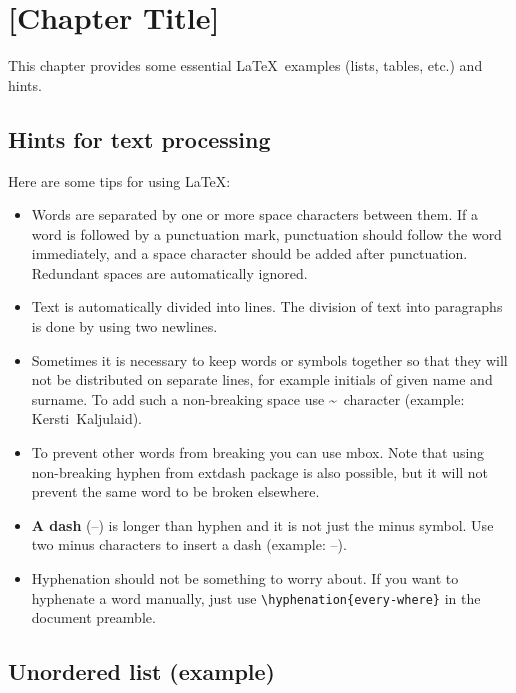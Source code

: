 \section{[Chapter Title]}

This chapter provides some essential \LaTeX\ examples (lists, tables,
etc.) and hints.

\subsection{Hints for text processing}

Here are some tips for using \LaTeX:

\begin{itemize}
\item Words are separated by one or       more space characters between
  them. If a word is followed by a punctuation mark, punctuation should
  follow the word immediately, and a space character should be added
  after punctuation. Redundant
  spaces      are
  automatically             ignored.

\item Text is automatically divided into lines. The division of text
  into paragraphs is done by using two newlines.

\item Sometimes it is necessary to keep words or symbols together so
  that they will not be distributed on separate lines, for example
  initials of given name and surname. To add such a non-breaking space
  use \textasciitilde\ character (example: Kersti~Kaljulaid).

\item To prevent other words from breaking you can use mbox. Note
  that using \mbox{non-breaking} hyphen from extdash package is also
  possible, but it will not prevent the same word to be broken
  elsewhere.

\item \textbf{A dash} (--) is longer than hyphen and it is not just
  the minus symbol. Use two minus characters to insert a dash
  (example: --).

\item Hyphenation should not be something to worry about. If you want to hyphenate a
  word manually, just use \verb!\hyphenation{every-where}! in the document preamble.

\end{itemize}

\subsection{Unordered list (example)}

